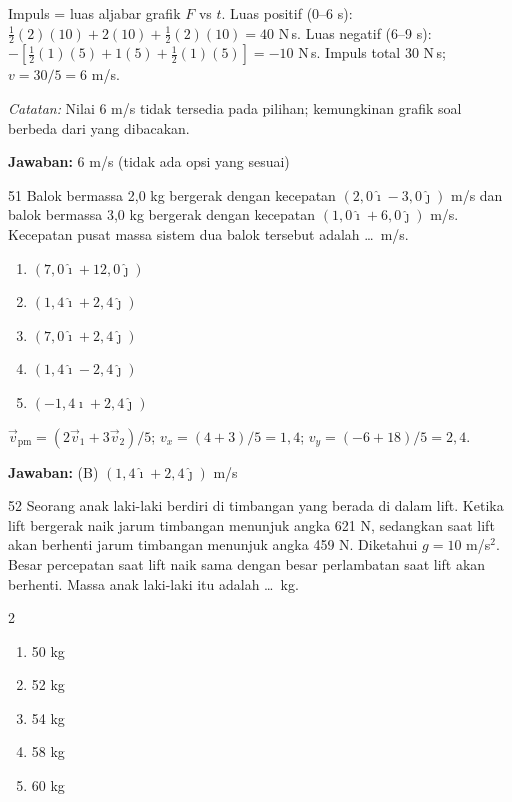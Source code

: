 \documentclass[11pt]{article}
\newenvironment{pil}{%
  \begin{enumerate}[label=(\Alph*),leftmargin=*,itemsep=1pt,topsep=3pt]}%
  {\end{enumerate}}
\newenvironment{pilB}{%
  \par\smallskip\begin{multicols}{2}
  \begin{enumerate}[label=(\Alph*),leftmargin=*,itemsep=1pt,topsep=3pt]}%
  {\end{enumerate}\end{multicols}}
\newcommand{\jawaban}[1]{%
  \noindent\colorbox{gold!30}{\parbox{\dimexpr\linewidth-2\fboxsep\relax}{%
    \textbf{Jawaban:} #1}}\par\smallskip}
\begin{document}
\begin{pembox}
Impuls = luas aljabar grafik $F$ vs $t$. Luas positif (0--6 s): $\tfrac{1}{2}(2)(10)+2(10)+\tfrac{1}{2}(2)(10)=40$ N\,s. Luas negatif (6--9 s): $-[\tfrac{1}{2}(1)(5)+1(5)+\tfrac{1}{2}(1)(5)]=-10$ N\,s. Impuls total 30 N\,s; $v=30/5=6$ m/s.

\textit{Catatan:} Nilai 6 m/s tidak tersedia pada pilihan; kemungkinan grafik soal berbeda dari yang dibacakan.
\jawaban{$6$ m/s (tidak ada opsi yang sesuai)}
\end{pembox}

\begin{soal}{51}
Balok bermassa 2,0 kg bergerak dengan kecepatan $(2{,}0\hat{\imath}-3{,}0\hat{\jmath})$
m/s dan balok bermassa 3,0 kg bergerak dengan kecepatan
$(1{,}0\hat{\imath}+6{,}0\hat{\jmath})$ m/s. Kecepatan pusat massa sistem
dua balok tersebut adalah \ldots\ m/s.
\begin{pil}
  \item $(7{,}0\hat{\imath}+12{,}0\hat{\jmath})$
  \item $(1{,}4\hat{\imath}+2{,}4\hat{\jmath})$
  \item $(7{,}0\hat{\imath}+2{,}4\hat{\jmath})$
  \item $(1{,}4\hat{\imath}-2{,}4\hat{\jmath})$
  \item $(-1{,}4\hat{\imath}+2{,}4\hat{\jmath})$
\end{pil}
\end{soal}

\begin{pembox}
$\vec{v}_{\text{pm}}=(2\vec{v}_1+3\vec{v}_2)/5$; $v_x=(4+3)/5=1{,}4$; $v_y=(-6+18)/5=2{,}4$.
\jawaban{(B) $(1{,}4\hat{\imath}+2{,}4\hat{\jmath})$ m/s}
\end{pembox}

\begin{soal}{52}
Seorang anak laki-laki berdiri di timbangan yang berada di dalam lift.
Ketika lift bergerak naik jarum timbangan menunjuk angka 621 N, sedangkan
saat lift akan berhenti jarum timbangan menunjuk angka 459 N. Diketahui
$g=10$ m/s$^2$. Besar percepatan saat lift naik sama dengan besar
perlambatan saat lift akan berhenti. Massa anak laki-laki itu adalah
\ldots\ kg.
\begin{pilB}
  \item 50 kg \item 52 kg \item 54 kg \item 58 kg \item 60 kg
\end{pilB}
\end{soal}
\end{document}
